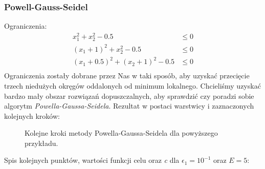\documentclass[a4paper,12pt]{article}
\begin{document}
\subsubsection{Powell-Gauss-Seidel}
Ograniczenia:
\begin{equation}
    \begin{split}
        x_{1}^{2} + x_{2}^{2} - 0.5 &\leq 0 \\
        (x_{1} + 1)^{2} + x_{2}^{2} - 0.5 &\leq 0 \\
        (x_{1} + 0.5)^{2} + (x_{2} + 1)^{2} - 0.5 &\leq 0 \\
    \end{split}
\end{equation}
Ograniczenia zostały dobrane przez Nas w taki sposób, aby uzyskać przecięcie trzech niedużych okręgów oddalonych od minimum lokalnego. Chcieliśmy uzyskać bardzo mały obszar rozwiązań dopuszczalnych, aby sprawdzić czy poradzi sobie algorytm \textit{Powella-Gaussa-Seidela}. Rezultat w postaci warstwicy i zaznaczonych kolejnych kroków:
\begin{figure}[H]
    \centering
    \quad
    \caption{Kolejne kroki metody Powella-Gaussa-Seidela dla powyższego przykładu.}
\end{figure}
Spis kolejnych punktów, wartości funkcji celu oraz \textit{c}  dla $\epsilon_{1} = 10^{-1}$ oraz $E = 5$:
\end{document}
